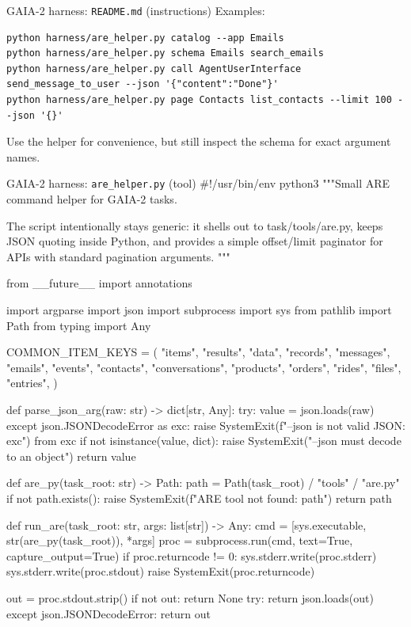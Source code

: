 \documentclass{llmxive}
\begin{document}
\begin{promptbox}{GAIA-2 harness: \texttt{README.md} (instructions)}
Examples:

\begin{lstlisting}
python harness/are_helper.py catalog --app Emails
python harness/are_helper.py schema Emails search_emails
python harness/are_helper.py call AgentUserInterface send_message_to_user --json '{"content":"Done"}'
python harness/are_helper.py page Contacts list_contacts --limit 100 --json '{}'
\end{lstlisting}

Use the helper for convenience, but still inspect the schema for exact argument names.
\end{promptbox}

\begin{promptbox}{GAIA-2 harness: \texttt{are\_helper.py} (tool)}
#!/usr/bin/env python3
"""Small ARE command helper for GAIA-2 tasks.

The script intentionally stays generic: it shells out to task/tools/are.py,
keeps JSON quoting inside Python, and provides a simple offset/limit paginator
for APIs with standard pagination arguments.
"""

from __future__ import annotations

import argparse
import json
import subprocess
import sys
from pathlib import Path
from typing import Any


COMMON_ITEM_KEYS = (
    "items",
    "results",
    "data",
    "records",
    "messages",
    "emails",
    "events",
    "contacts",
    "conversations",
    "products",
    "orders",
    "rides",
    "files",
    "entries",
)


def parse_json_arg(raw: str) -> dict[str, Any]:
    try:
        value = json.loads(raw)
    except json.JSONDecodeError as exc:
        raise SystemExit(f"--json is not valid JSON: {exc}") from exc
    if not isinstance(value, dict):
        raise SystemExit("--json must decode to an object")
    return value


def are_py(task_root: str) -> Path:
    path = Path(task_root) / "tools" / "are.py"
    if not path.exists():
        raise SystemExit(f"ARE tool not found: {path}")
    return path


def run_are(task_root: str, args: list[str]) -> Any:
    cmd = [sys.executable, str(are_py(task_root)), *args]
    proc = subprocess.run(cmd, text=True, capture_output=True)
    if proc.returncode != 0:
        sys.stderr.write(proc.stderr)
        sys.stderr.write(proc.stdout)
        raise SystemExit(proc.returncode)

    out = proc.stdout.strip()
    if not out:
        return None
    try:
        return json.loads(out)
    except json.JSONDecodeError:
        return out



\end{promptbox}
\end{document}
